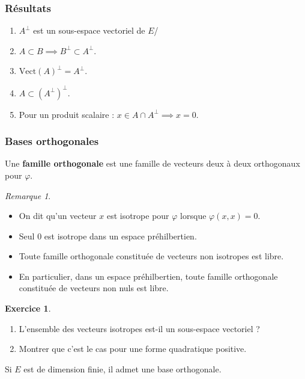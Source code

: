 \documentclass[french]{article}
\theoremstyle{plain}
\theoremstyle{definition}
\newtheorem{exo}{Exercice}
\theoremstyle{remark}
\newtheorem*{rmq}{Remarque}
\begin{document}
\subsubsection*{Résultats}

\begin{enumerate}
	\item $A^\bot$ est un sous-espace vectoriel de $E$/
	\item $A\subset B\implies B^\bot\subset A^\bot$.
	\item $\text{Vect}(A)^\bot=A^\bot$.
	\item $A\subset (A^\bot)^\bot$.
	\item Pour un produit scalaire : $x\in A\cap A^\bot\implies x=0$.
\end{enumerate}

\subsubsection*{Bases orthogonales}

\begin{dfn}
	Une \textbf{famille orthogonale} est une famille de vecteurs deux à deux orthogonaux pour $\varphi$.
\end{dfn}

\begin{rmq}
	\begin{itemize}
		\item On dit qu'un vecteur $x$ est isotrope pour $\varphi$ lorsque $\varphi(x,x)=0$.
		\item Seul $0$ est isotrope dans un espace préhilbertien.
		\item Toute famille orthogonale constituée de vecteurs non isotropes est libre.
		\item En particulier, dans un espace préhilbertien, toute famille orthogonale constituée de vecteurs non nuls est libre.
	\end{itemize}
\end{rmq}

\begin{exo}
	\begin{enumerate}
		\item L'ensemble des vecteurs isotropes est-il un sous-espace vectoriel ?
		\item Montrer que c'est le cas pour une forme quadratique positive.
	\end{enumerate}
\end{exo}

\begin{thm}{}
	Si $E$ est de dimension finie, il admet une base orthogonale.
\end{thm}
\end{document}
